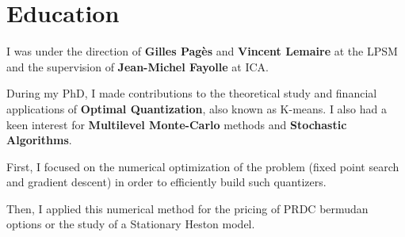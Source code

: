 \documentclass[]{deedy-resume-openfont}
\begin{document}
\sectionsep
\sectionsep


\sectionsep


\section{Education}
\sectionsep

I was under the direction of \textbf{Gilles Pagès} and \textbf{Vincent Lemaire} at the LPSM and the supervision of \textbf{Jean-Michel Fayolle} at ICA.

\vspace{0.2cm}
During my PhD, I made contributions to the theoretical study and financial applications of \textbf{Optimal Quantization}, also known as K-means. I also had a keen interest for \textbf{Multilevel Monte-Carlo} methods and \textbf{Stochastic Algorithms}.
\vspace{0.1cm}
\begin{tightemize}
	\item[\diamond] First, I focused on the numerical optimization of the problem (fixed point search and gradient descent) in order to efficiently build such quantizers.
	\item[\diamond] Then, I applied this numerical method for the pricing of PRDC bermudan options or the study of a Stationary Heston model.
\end{tightemize}

\sectionsep
\sectionsep

\end{document}
